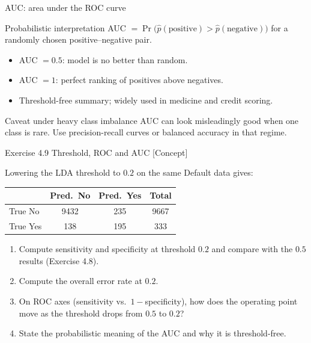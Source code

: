 \documentclass[aspectratio=169,11pt]{beamer}
\begin{document}
\begin{frame}{AUC: area under the ROC curve}
  \begin{block}{Probabilistic interpretation}
    AUC $= \Pr\bigl(\hat p(\text{positive}) > \hat p(\text{negative})\bigr)$
    for a randomly chosen positive--negative pair.
  \end{block}
  \begin{readme}
    \begin{itemize}
      \item AUC $= 0.5$: model is no better than random.
      \item AUC $= 1$: perfect ranking of positives above negatives.
      \item Threshold-free summary; widely used in medicine and
            credit scoring.
    \end{itemize}
  \end{readme}
  \begin{alertblock}{Caveat under heavy class imbalance}
    AUC can look misleadingly good when one class is rare. Use
    precision-recall curves or balanced accuracy in that regime.
  \end{alertblock}
\end{frame}



\begin{frame}{Exercise 4.9 \textemdash{} Threshold, ROC and AUC [Concept]}
\begin{exercise}
Lowering the LDA threshold to $0.2$ on the same Default data gives:
\begin{center}\small
\begin{tabular}{l|cc|c}
\toprule
 & Pred.\ No & Pred.\ Yes & Total \\
\midrule
True No  & 9432 & 235 & 9667 \\
True Yes & 138  & 195 & 333 \\
\bottomrule
\end{tabular}
\end{center}
\begin{enumerate}
  \item Compute sensitivity and specificity at threshold $0.2$ and
        compare with the $0.5$ results (Exercise 4.8).
  \item Compute the overall error rate at $0.2$.
  \item On ROC axes (sensitivity vs.\ $1-$specificity), how does the
        operating point move as the threshold drops from $0.5$ to $0.2$?
  \item State the probabilistic meaning of the AUC and why it is
        threshold-free.
\end{enumerate}
\end{exercise}
\end{frame}
\end{document}
